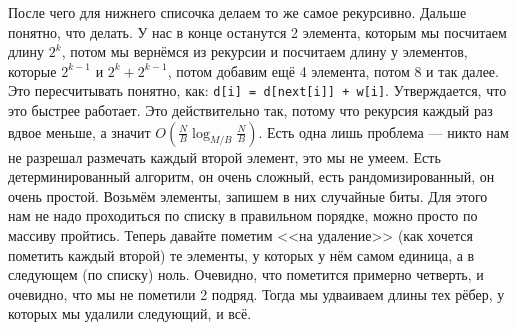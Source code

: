 \documentclass{article}
\newcommand{\pseudo}{PseudoLexer.py:PseudoLexer -x}
\newcommand{\pseudocode}[1]{\texttt{#1}}
\begin{document}
    После чего для нижнего списочка делаем то же самое рекурсивно. Дальше понятно, что делать. У нас в конце останутся 2 элемента, которым мы посчитаем длину $2^k$, потом мы вернёмся из рекурсии и посчитаем длину у элементов, которые $2^{k-1}$ и $2^k+2^{k-1}$, потом добавим ещё 4 элемента, потом 8 и так далее. Это пересчитывать понятно, как: \pseudocode{d[i] = d[next[i]] + w[i]}. Утверждается, что это быстрее работает. Это действительно так, потому что рекурсия каждый раз вдвое меньше, а значит $O\left(\frac NB\log_{M/B}\frac NB\right)$. Есть одна лишь проблема --- никто нам не разрешал размечать каждый второй элемент, это мы не умеем. Есть детерминированный алгоритм, он очень сложный, есть рандомизированный, он очень простой. Возьмём элементы, запишем в них случайные биты. Для этого нам не надо проходиться по списку в правильном порядке, можно просто по массиву пройтись. Теперь давайте пометим <<на удаление>> (как хочется пометить каждый второй) те элементы, у которых у нём самом единица, а в следующем (по списку) ноль. Очевидно, что пометится примерно четверть, и очевидно, что мы не пометили 2 подряд. Тогда мы удваиваем длины тех рёбер, у которых мы удалили следующий, и всё.
\end{document}

